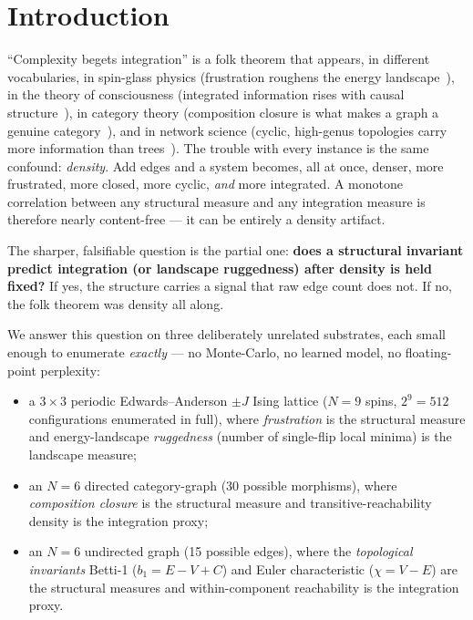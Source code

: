 \documentclass[11pt,a4paper]{article}
\begin{document}
\section{Introduction}
\label{sec:intro}

``Complexity begets integration'' is a folk theorem that appears, in different
vocabularies, in spin-glass physics (frustration roughens the energy
landscape~\citep{toulouse1977,binderyoung1986}), in the theory of consciousness
(integrated information rises with causal structure~\citep{tononi2004,oizumi2014}),
in category theory (composition closure is what makes a graph a genuine
category~\citep{maclane1971}), and in network science (cyclic, high-genus
topologies carry more information than trees~\citep{bianconi2021}). The trouble
with every instance is the same confound: \emph{density}. Add edges and a system
becomes, all at once, denser, more frustrated, more closed, more cyclic,
\emph{and} more integrated. A monotone correlation between any structural
measure and any integration measure is therefore nearly content-free --- it can
be entirely a density artifact.

The sharper, falsifiable question is the partial one: \textbf{does a structural
invariant predict integration (or landscape ruggedness) after density is held
fixed?} If yes, the structure carries a signal that raw edge count does not. If
no, the folk theorem was density all along.

We answer this question on three deliberately unrelated substrates, each small
enough to enumerate \emph{exactly} --- no Monte-Carlo, no learned model, no
floating-point perplexity:
\begin{itemize}\itemsep0.2em
  \item a $3{\times}3$ periodic Edwards--Anderson $\pm J$ Ising lattice
        ($N{=}9$ spins, $2^9 = 512$ configurations enumerated in full), where
        \emph{frustration} is the structural measure and energy-landscape
        \emph{ruggedness} (number of single-flip local minima) is the landscape
        measure;
  \item an $N{=}6$ directed category-graph (30 possible morphisms), where
        \emph{composition closure} is the structural measure and
        transitive-reachability density is the integration proxy;
  \item an $N{=}6$ undirected graph (15 possible edges), where the
        \emph{topological invariants} Betti-1 ($b_1 = E-V+C$) and Euler
        characteristic ($\chi = V-E$) are the structural measures and
        within-component reachability is the integration proxy.
\end{itemize}
\end{document}

